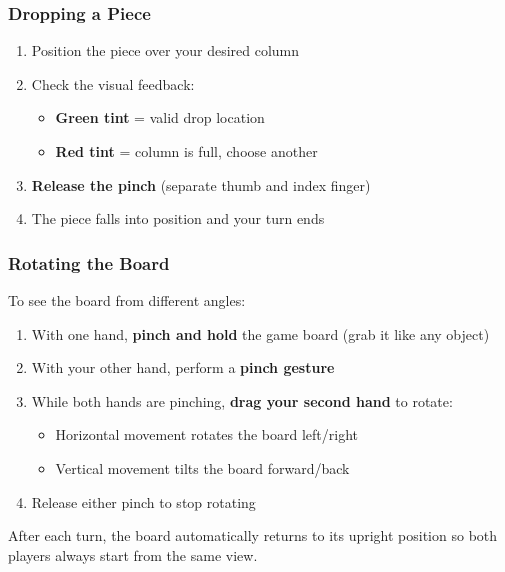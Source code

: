 \documentclass[11pt]{article}
\begin{document}
\subsubsection{Dropping a Piece}

\begin{enumerate}
    \item Position the piece over your desired column
    \item Check the visual feedback:
    \begin{itemize}
        \item \textbf{Green tint} = valid drop location
        \item \textbf{Red tint} = column is full, choose another
    \end{itemize}
    \item \textbf{Release the pinch} (separate thumb and index finger)
    \item The piece falls into position and your turn ends
\end{enumerate}


\subsubsection{Rotating the Board}

To see the board from different angles:

\begin{enumerate}
    \item With one hand, \textbf{pinch and hold} the game board (grab it like any object)
    \item With your other hand, perform a \textbf{pinch gesture}
    \item While both hands are pinching, \textbf{drag your second hand} to rotate:
    \begin{itemize}
        \item Horizontal movement rotates the board left/right
        \item Vertical movement tilts the board forward/back
    \end{itemize}
    \item Release either pinch to stop rotating
\end{enumerate}

After each turn, the board automatically returns to its upright position so both players always start from the same view.
\end{document}
